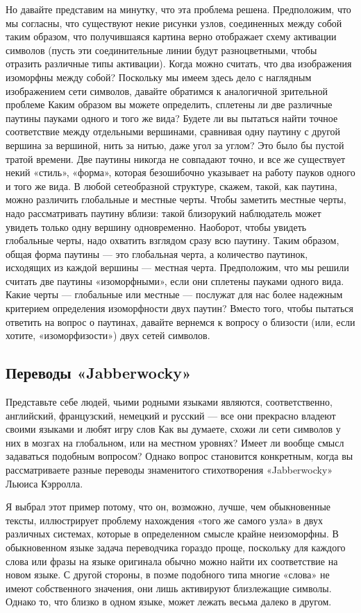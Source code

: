 \documentclass[../main.tex]{subfiles}
\begin{document}
Но давайте представим на минутку, что эта проблема решена. Предположим, что мы согласны, что существуют некие рисунки узлов, соединенных между собой таким образом, что получившаяся картина верно отображает схему активации символов (пусть эти соединительные линии будут разноцветными, чтобы отразить различные типы активации). Когда можно считать, что два изображения изоморфны между собой? Поскольку мы имеем здесь дело с наглядным изображением сети символов, давайте обратимся к аналогичной зрительной проблеме Каким образом вы можете определить, сплетены ли две различные паутины пауками одного и того же вида? Будете ли вы пытаться найти точное соответствие между отдельными вершинами, сравнивая одну паутину с другой вершина за вершиной, нить за нитью, даже угол за углом? Это было бы пустой тратой времени. Две паутины никогда не совпадают точно, и все же существует некий «стиль», «форма», которая безошибочно указывает на работу пауков одного и того же вида. В любой сетеобразной структуре, скажем, такой, как паутина, можно различить глобальные и местные черты. Чтобы заметить местные черты, надо рассматривать паутину вблизи: такой близорукий наблюдатель может увидеть только одну вершину одновременно. Наоборот, чтобы увидеть глобальные черты, надо охватить взглядом сразу всю паутину. Таким образом, общая форма паутины --- это глобальная черта, а количество паутинок, исходящих из каждой вершины --- местная черта. Предположим, что мы решили считать две паутины «изоморфными», если они сплетены пауками одного вида. Какие черты --- глобальные или местные --- послужат для нас более надежным критерием определения изоморфности двух паутин? Вместо того, чтобы пытаться ответить на вопрос о паутинах, давайте вернемся к вопросу о близости (или, если хотите, «изоморфизости») двух сетей символов.


\subsection{Переводы «Jabberwocky»}

Представьте себе людей, чьими родными языками являются, соответственно, английский, французский, немецкий и русский --- все они прекрасно владеют своими языками и любят игру слов Как вы думаете, схожи ли сети символов у них в мозгах на глобальном, или на местном уровнях? Имеет ли вообще смысл задаваться подобным вопросом? Однако вопрос становится конкретным, когда вы рассматриваете разные переводы знаменитого стихотворения «Jabberwocky» Льюиса Кэрролла.

Я выбрал этот пример потому, что он, возможно, лучше, чем обыкновенные тексты, иллюстрирует проблему нахождения «того же самого узла» в двух различных системах, которые в определенном смысле крайне неизоморфны. В обыкновенном языке задача переводчика гораздо проще, поскольку для каждого слова или фразы на языке оригинала обычно можно найти их соответствие на новом языке. С другой стороны, в поэме подобного типа многие «слова» не имеют собственного значения, они лишь активируют близлежащие символы. Однако то, что близко в одном языке, может лежать весьма далеко в другом.
\end{document}
